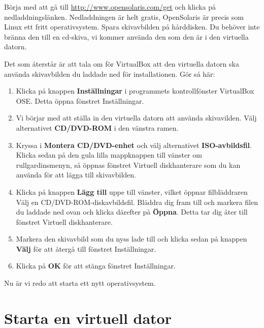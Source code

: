 \documentclass[a4paper,final]{memoir} %
\begin{document}
Börja med att gå till \url{http://www.opensolaris.com/get} och klicka på nedladdningslänken. Nedladdningen är helt gratis, OpenSolaris är precis som Linux ett fritt operativsystem. Spara skivavbilden på hårddisken. Du behöver inte bränna den till en cd-skiva, vi kommer använda den som den är i den virtuella datorn.

Det som återstår är att tala om för VirtualBox att den virtuella datorn ska använda skivavbilden du laddade ned för installationen. Gör så här:

\begin{enumerate}

\item Klicka på knappen \textbf{Inställningar} i programmets kontrollfönster VirtualBox OSE. Detta öppna fönstret Inställningar.

\item Vi börjar med att ställa in den virtuella datorn att använda skivavilden. Välj alternativet \textbf{CD/DVD-ROM} i den vänstra ramen.

\item Kryssa i \textbf{Montera CD/DVD-enhet} och välj alternativet \textbf{ISO-avbildsfil}. Klicka sedan på den gula lilla mappknappen till vänster om rullgardinsmenyn, så öppnas fönstret Virtuell diskhanterare som du kan använda för att lägga till skivavbilden.


\item Klicka på knappen \textbf{Lägg till} uppe till vänster, vilket öppnar filbläddraren Välj en CD/DVD-ROM-diskavbildsfil. Bläddra dig fram till och markera filen du laddade ned ovan och klicka därefter på \textbf{Öppna}. Detta tar dig åter till fönstret Virtuell diskhanterare.

\item Markera den skivavbild som du nyss lade till och klicka sedan på knappen \textbf{Välj} för att återgå till fönstret Inställningar.

\item Klicka på \textbf{OK} för att stänga fönstret Inställningar.

\end{enumerate}

Nu är vi redo att starta ett nytt operativsystem.

\section{Starta en virtuell dator}
\end{document}
